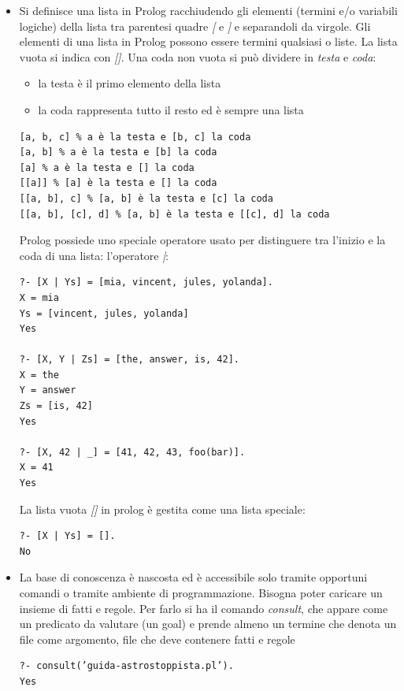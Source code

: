 \documentclass[a4paper,12pt, oneside]{book}
\begin{document}
\begin{itemize}
\begin{esempio}
\begin{verbatim}
aula(Corso, Luogo) :- corso(Corso, _, Luogo, _).
\end{verbatim}
oppure ancora i predicati che abbiamo definito a partire dalle relazioni con 6 o 4 campi possono essere ricodificate con predicati binari:
\begin{verbatim}
giorno(linguaggi, martedì).
orario(linguaggi, ’9:30’).
edificio(linguaggi, ’U4’).
aula(linguaggi, 3).
docente(linguaggi, antoniotti).
\end{verbatim}
La relazioni a 6 o 4 argomenti possono essere ricostruite in a partire da queste relazioni binarie. La costruzione di schemi \textit{RDF/XML} (e, a volte,\textit{ SQL}) corrisponde a questa operazione di ri-rappresentazione
\end{esempio}
\item Si definisce una lista in Prolog racchiudendo gli elementi (termini e/o variabili logiche) della lista tra parentesi quadre \textit{[} e \textit{]} e separandoli da virgole. Gli elementi di una lista in Prolog possono essere termini
qualsiasi o liste. La lista vuota si indica con \textit{[]}. Una coda non vuota si può dividere in \textit{testa} e \textit{coda}:
\begin{itemize}
\item la testa è il primo elemento della lista
\item la coda rappresenta tutto il resto ed è sempre una lista
\end{itemize}
\begin{verbatim}
[a, b, c] % a è la testa e [b, c] la coda
[a, b] % a è la testa e [b] la coda
[a] % a è la testa e [] la coda
[[a]] % [a] è la testa e [] la coda
[[a, b], c] % [a, b] è la testa e [c] la coda
[[a, b], [c], d] % [a, b] è la testa e [[c], d] la coda
\end{verbatim}
Prolog possiede uno speciale operatore usato per distinguere tra l'inizio e la coda di una lista: l'operatore \textit{|}:
\begin{verbatim}
?- [X | Ys] = [mia, vincent, jules, yolanda].
X = mia
Ys = [vincent, jules, yolanda]
Yes

?- [X, Y | Zs] = [the, answer, is, 42].
X = the
Y = answer
Zs = [is, 42]
Yes

?- [X, 42 | _] = [41, 42, 43, foo(bar)].
X = 41
Yes
\end{verbatim}
La lista vuota \textit{[]} in prolog è gestita come una lista speciale:
\begin{verbatim}
?- [X | Ys] = [].
No
\end{verbatim}
\item La base di conoscenza è nascosta ed è accessibile solo tramite opportuni comandi o tramite ambiente di programmazione. Bisogna poter caricare un insieme di fatti e regole. Per farlo si ha il comando \textit{consult}, che appare come un predicato da valutare (un goal) e prende almeno un termine che denota un file come argomento, file che deve contenere fatti e regole
\begin{verbatim}
?- consult(’guida-astrostoppista.pl’).
Yes


\end{verbatim}
\end{itemize}
\end{document}
